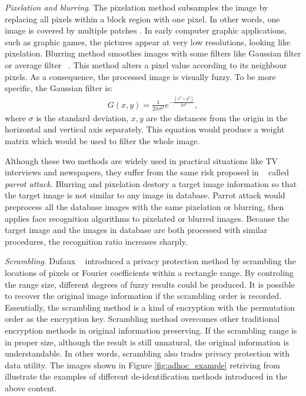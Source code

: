 	{\it Pixelation and blurring}. The pixelation method subsamples the image by 
	replacing all pixels within a 
	block region with one pixel. In other words, one image is covered by multiple
	patches \cite{Boyle00}. In early computer graphic applications, such as graphic
	games, the pictures appear at very low resolutions, looking like pixelation.
	Blurring method smoothes images with some filters like Gaussian filter or 
	average filter ~\cite{Agrawal09,blur05}. This method alters a pixel value 
	according to its neighbour pixels. As a consequence, the processed image is
	visually fuzzy. To be more specific, the Gaussian filter is:
	\begin{equation}
    \label{equ:gaussian}
      \begin{aligned}
      		G(x,y) = \frac{1}{2\pi\sigma^2} e^{-\frac{(x^2+y^2)}{2\sigma^2}},
      \end{aligned}
    \end{equation}
    where $\sigma$ is the standard deviation, $x,y$ are the distances from the 
    origin in the horizontal and vertical axis separately. This equation would
    produce a weight matrix which would be used to filter the whole image.

	Although these two methods are widely used in practical situations like TV 
	interviews and newspapers, they suffer from the same risk proposed in ~\cite{Newton05} 
	called {\it parrot attack}. Blurring and pixelation destory a target image 
	information so that the target image is not similar to any image in database. 
	Parrot attack would preprocess all the database images with the same pixelation or 
	blurring, then applies face recognition algorithms to pixelated or blurred 
	images. Because the target image and the images in database are both processed
	with similar procedures, the recognition ratio increases sharply. 

	{\it Scrambling}. Dufaux ~\cite{dufaux08} introduced a privacy protection method 
	by scrambling 
	the locations of pixels or Fourier coefficients within a rectangle range. By 
	controling the range size, different degrees of fuzzy results could be produced. 
	It is possible to recover the original image information if the scrambling order 
	is recorded. Essentially, the scrambling method is a kind of encryption with 
	the permutation order as the encryption key. Scrambling method overcomes other 
	traditional encryption methods in original information preserving. If the 
	scrambling range is in proper size, although the result is still unnatural, 
	the original information is understandable.
	In other words, scrambling also trades privacy protection with data utility. 
	The images shown in Figure \ref{fig:adhoc_example} retriving from \cite{dufaux10} 
	illustrate the examples of different de-identification methods introduced in
	the above content. 

